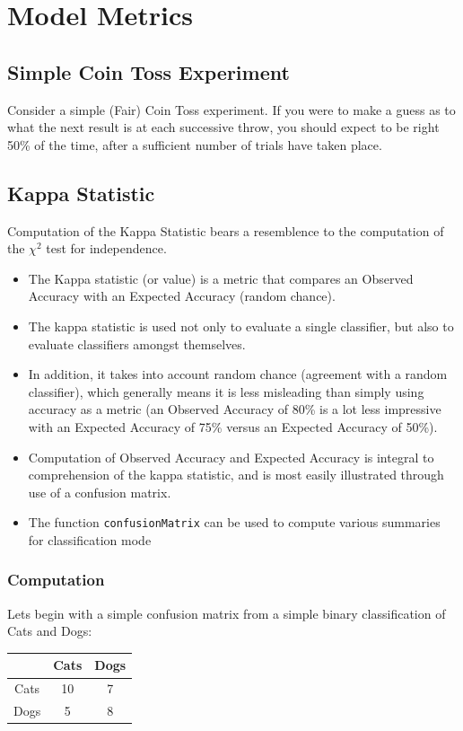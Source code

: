 \documentclass[caret-main.tex]{subfiles}
\begin{document}
\section{Model Metrics}


\subsection{Simple Coin Toss Experiment}

Consider a simple (Fair) Coin Toss experiment. If you were to make a guess as to what the next result is  at each successive throw, you should expect to be right 50\% of the time, after a sufficient number of trials have taken place.

\subsection{Kappa Statistic}

Computation of the Kappa Statistic bears a resemblence to the computation of the $\chi^2$ test for independence.
\begin{itemize}
\item The Kappa statistic (or value) is a metric that compares an Observed Accuracy with an Expected Accuracy (random chance).\item The kappa statistic is used not only to evaluate a single classifier, but also to evaluate classifiers amongst themselves. \item In addition, it takes into account random chance (agreement with a random classifier), which generally means it is less misleading than simply using accuracy as a metric (an Observed Accuracy of 80\% is a lot less impressive with an Expected Accuracy of 75\% versus an Expected Accuracy of 50\%). \item Computation of Observed Accuracy and Expected Accuracy is integral to comprehension of the kappa statistic, and is most easily illustrated through use of a confusion matrix.
\item 
The function \texttt{confusionMatrix} can be used to compute various summaries for classification
mode
\end{itemize}
\subsubsection{Computation}
Lets begin with a simple confusion matrix from a simple binary classification of Cats and Dogs:
\begin{center}
\begin{tabular}{|c|c|c|}
\hline 
    & Cats &Dogs \\ \hline
Cats& 10 & 7 \\ \hline
Dogs& 5  & 8  \\ \hline
\end{tabular} 
\end{center}
\end{document}

